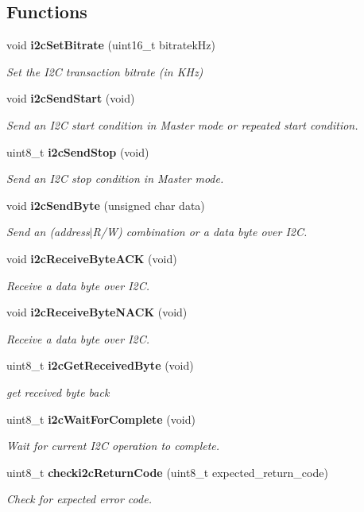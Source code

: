 \subsection*{Functions}
\begin{DoxyCompactItemize}
\item 
void \textbf{ i2c\+Set\+Bitrate} (uint16\+\_\+t bitratek\+Hz)
\begin{DoxyCompactList}\small\item\em Set the I2C transaction bitrate (in K\+Hz) \end{DoxyCompactList}\item 
void \textbf{ i2c\+Send\+Start} (void)
\begin{DoxyCompactList}\small\item\em Send an I2C start condition in Master mode or repeated start condition. \end{DoxyCompactList}\item 
uint8\+\_\+t \textbf{ i2c\+Send\+Stop} (void)
\begin{DoxyCompactList}\small\item\em Send an I2C stop condition in Master mode. \end{DoxyCompactList}\item 
void \textbf{ i2c\+Send\+Byte} (unsigned char data)
\begin{DoxyCompactList}\small\item\em Send an (address$\vert$\+R/W) combination or a data byte over I2C. \end{DoxyCompactList}\item 
void \textbf{ i2c\+Receive\+Byte\+A\+CK} (void)
\begin{DoxyCompactList}\small\item\em Receive a data byte over I2C. \end{DoxyCompactList}\item 
void \textbf{ i2c\+Receive\+Byte\+N\+A\+CK} (void)
\begin{DoxyCompactList}\small\item\em Receive a data byte over I2C. \end{DoxyCompactList}\item 
uint8\+\_\+t \textbf{ i2c\+Get\+Received\+Byte} (void)
\begin{DoxyCompactList}\small\item\em get received byte back \end{DoxyCompactList}\item 
uint8\+\_\+t \textbf{ i2c\+Wait\+For\+Complete} (void)
\begin{DoxyCompactList}\small\item\em Wait for current I2C operation to complete. \end{DoxyCompactList}\item 
uint8\+\_\+t \textbf{ checki2c\+Return\+Code} (uint8\+\_\+t expected\+\_\+return\+\_\+code)
\begin{DoxyCompactList}\small\item\em Check for expected error code. \end{DoxyCompactList}\end{DoxyCompactItemize}


